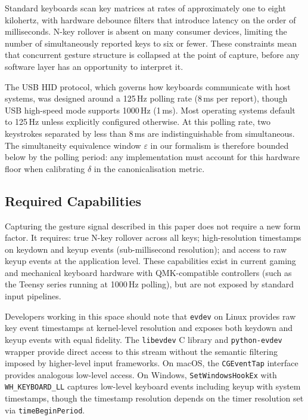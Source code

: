 \documentclass[11pt, a4paper]{article}
\begin{document}
Standard keyboards scan key matrices at rates of approximately one to
eight kilohertz, with hardware debounce filters that introduce latency on
the order of milliseconds. N-key rollover is absent on many consumer
devices, limiting the number of simultaneously reported keys to six or
fewer. These constraints mean that concurrent gesture structure is
collapsed at the point of capture, before any software layer has an
opportunity to interpret it.

The USB HID protocol, which governs how keyboards communicate with host
systems, was designed around a 125\,Hz polling rate (8\,ms per report),
though USB high-speed mode supports 1000\,Hz (1\,ms). Most operating
systems default to 125\,Hz unless explicitly configured otherwise. At
this polling rate, two keystrokes separated by less than 8\,ms are
indistinguishable from simultaneous. The simultaneity equivalence window
$\varepsilon$ in our formalism is therefore bounded below by the polling
period: any implementation must account for this hardware floor when
calibrating $\delta$ in the canonicalisation metric.

\subsection{Required Capabilities}

Capturing the gesture signal described in this paper does not require a
new form factor. It requires: true N-key rollover across all keys;
high-resolution timestamps on keydown and keyup events (sub-millisecond
resolution); and access to raw keyup events at the application level.
These capabilities exist in current gaming and mechanical keyboard
hardware with QMK-compatible controllers (such as the Teensy series
running at 1000\,Hz polling), but are not exposed by standard input
pipelines.

Developers working in this space should note that \texttt{evdev} on
Linux provides raw key event timestamps at kernel-level resolution and
exposes both keydown and keyup events with equal fidelity. The
\texttt{libevdev} C library and \texttt{python-evdev} wrapper provide
direct access to this stream without the semantic filtering imposed by
higher-level input frameworks. On macOS, the \texttt{CGEventTap}
interface provides analogous low-level access. On Windows,
\texttt{SetWindowsHookEx} with \texttt{WH\_KEYBOARD\_LL} captures
low-level keyboard events including keyup with system timestamps,
though the timestamp resolution depends on the timer resolution set via
\texttt{timeBeginPeriod}.
\end{document}

